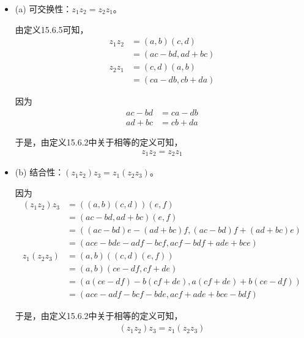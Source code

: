 \documentclass{article}
\begin{document}
\begin{itemize}
  \item (a) 可交换性：$z_1z_2 = z_2z_1$。

        由定义15.6.5可知，
        \begin{align*}
          z_1z_2 & = (a, b)(c, d)       \\
                 & = (ac - bd, ad + bc)
        \end{align*}
        \begin{align*}
          z_2z_1 & = (c, d)(a, b)       \\
                 & = (ca - db, cb + da)
        \end{align*}

        因为
        \begin{align*}
          ac - bd & = ca - db \\
          ad + bc & = cb + da
        \end{align*}

        于是，由定义15.6.2中关于相等的定义可知，
        \begin{align*}
          z_1z_2 = z_2z_1
        \end{align*}

  \item (b) 结合性：$(z_1z_2)z_3 = z_1(z_2z_3)$。

        因为
        \begin{align*}
          (z_1z_2)z_3 & = ((a, b)(c, d))(e, f)                             \\
                      & = (ac - bd, ad + bc)(e, f)                         \\
                      & = ((ac-bd)e - (ad + bc)f, (ac - bd)f + (ad + bc)e) \\
                      & = (ace - bde - adf - bcf, acf - bdf + ade + bce)
        \end{align*}
        \begin{align*}
          z_1(z_2z_3) & = (a, b)((c, d)(e, f))                               \\
                      & = (a, b)(ce - df, cf + de)                           \\
                      & = (a(ce - df) - b(cf + de), a(cf + de) + b(ce - df)) \\
                      & = (ace - adf - bcf - bde, acf + ade + bce - bdf)
        \end{align*}

        于是，由定义15.6.2中关于相等的定义可知，
        \begin{align*}
          (z_1z_2)z_3 = z_1(z_2z_3)
        \end{align*}


\end{itemize}
\end{document}

